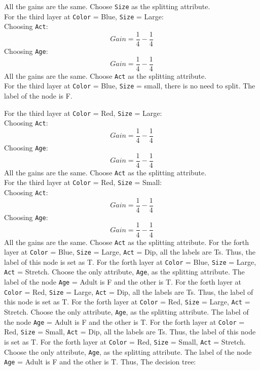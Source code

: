 All the gains are the same. Choose \texttt{Size} as the splitting attribute.\\
For the third layer at \texttt{Color} = Blue, \texttt{Size} = Large:\\
Choosing \texttt{Act}:
\begin{equation*}
	Gain = \frac{1}{4} - \frac{1}{4}
\end{equation*}
Choosing \texttt{Age}:
\begin{equation*}
	Gain = \frac{1}{4} - \frac{1}{4}
\end{equation*}
All the gains are the same. Choose \texttt{Act} as the splitting attribute.\\
For the third layer at \texttt{Color} = Blue, \texttt{Size} = small, there is no need to split. The label of the node is F.

For the third layer at \texttt{Color} = Red, \texttt{Size} = Large:\\
Choosing \texttt{Act}:
\begin{equation*}
	Gain = \frac{1}{4} - \frac{1}{4}
\end{equation*}
Choosing \texttt{Age}:
\begin{equation*}
	Gain = \frac{1}{4} - \frac{1}{4}
\end{equation*}
All the gains are the same. Choose \texttt{Act} as the splitting attribute.\\
For the third layer at \texttt{Color} = Red, \texttt{Size} = Small:\\
Choosing \texttt{Act}:
\begin{equation*}
	Gain = \frac{1}{4} - \frac{1}{4}
\end{equation*}
Choosing \texttt{Age}:
\begin{equation*}
	Gain = \frac{1}{4} - \frac{1}{4}
\end{equation*}
All the gains are the same. Choose \texttt{Act} as the splitting attribute. For the forth layer at \texttt{Color} = Blue, \texttt{Size} = Large, \texttt{Act} = Dip, all the labels are Ts. Thus, the label of this node is set as T. For the forth layer at \texttt{Color} = Blue, \texttt{Size} = Large, \texttt{Act} = Stretch. Choose the only attribute, \texttt{Age}, as the splitting attribute. The label of the node \texttt{Age} = Adult is F and the other is T. For the forth layer at \texttt{Color} = Red, \texttt{Size} = Large, \texttt{Act} = Dip, all the labels are Ts. Thus, the label of this node is set as T. For the forth layer at \texttt{Color} = Red, \texttt{Size} = Large, \texttt{Act} = Stretch. Choose the only attribute, \texttt{Age}, as the splitting attribute. The label of the node \texttt{Age} = Adult is F and the other is T. For the forth layer at \texttt{Color} = Red, \texttt{Size} = Small, \texttt{Act} = Dip, all the labels are Ts. Thus, the label of this node is set as T. For the forth layer at \texttt{Color} = Red, \texttt{Size} = Small, \texttt{Act} = Stretch. Choose the only attribute, \texttt{Age}, as the splitting attribute. The label of the node \texttt{Age} = Adult is F and the other is T. Thus, The decision tree:
